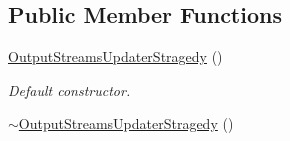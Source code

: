 \subsection*{Public Member Functions}
\begin{DoxyCompactItemize}
\item 
\hypertarget{class_output_streams_updater_stragedy_aa1a18127665771ddc94a896e33afd1ef}{}\hyperlink{class_output_streams_updater_stragedy_aa1a18127665771ddc94a896e33afd1ef}{Output\+Streams\+Updater\+Stragedy} ()\label{class_output_streams_updater_stragedy_aa1a18127665771ddc94a896e33afd1ef}

\begin{DoxyCompactList}\small\item\em Default constructor. \end{DoxyCompactList}\item 
\hypertarget{class_output_streams_updater_stragedy_a677aab9989e7a229bf04b4710e9f85af}{}\hyperlink{class_output_streams_updater_stragedy_a677aab9989e7a229bf04b4710e9f85af}{$\sim$\+Output\+Streams\+Updater\+Stragedy} ()\label{class_output_streams_updater_stragedy_a677aab9989e7a229bf04b4710e9f85af}


\end{DoxyCompactItemize}
